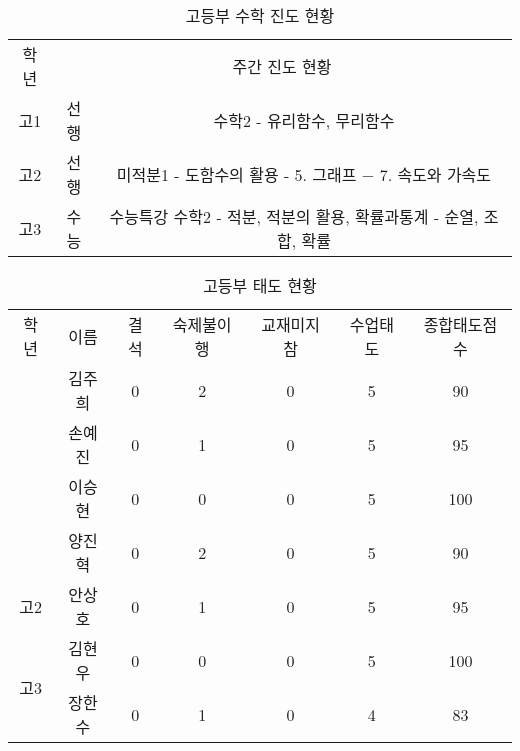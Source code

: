 \documentclass[idxtotoc,hyperref,openany]{labbook} %
\begin{document}


\begin{table}[h]
\centering
\begin{adjustbox}{width=\textwidth}
\begin{tabular}{c||c|c}
\toprule
\midrule
학년 & \multicolumn{2}{c}{주간 진도 현황} \\
\hhline{=||==}
고1 & 선행 & 수학2 - 유리함수, 무리함수\\
\hline
고2 & 선행 & 미적분1 - 도함수의 활용 - 5. 그래프 $-$ 7. 속도와 가속도\\
\hline
\multirow{1}{*}{고3} & 수능 & 수능특강 수학2 - 적분, 적분의 활용, 확률과통계 - 순열, 조합, 확률 \\ 

\hline
\end{tabular}
\end{adjustbox}
\caption{\label{tab:ii} 고등부 수학 진도 현황 }
\end{table}





\begin{table}[H]
\centering
\begin{adjustbox}{width=\textwidth}
\begin{tabular}{c|c||c|c|c|c|c}
\toprule
\midrule
학년 & 이름 & 결석 & 숙제불이행 & 교재미지참 & 수업태도 & 종합태도점수 \\
\hhline{=|=||=|=|=|=|=}
\multirow{4}{*}{고1}			& 김주희 & 0 & 2 & 0 & 5 & 90   \\ \hhline{~------}
					& 손예진 & 0 & 1 & 0 & 5 & 95  \\ \hhline{~------}
					& 이승현 & 0 & 0 & 0 & 5 & 100  \\ \hhline{~------}
					& 양진혁 & 0 & 2 & 0 & 5 & 90 \\
\hline
\multirow{1}{*}{고2}			& 안상호 & 0 & 1 & 0 & 5 & 95	\\ 
\hline
\multirow{2}{*}{고3}			& 김현우 & 0 & 0 & 0 & 5 & 100  \\ \hhline{~------}
					& 장한수 & 0 & 1 & 0 & 4 & 83	\\
\hline
\end{tabular}
\end{adjustbox}
\caption{\label{tab:iii} 고등부 태도 현황 }
\end{table}
\end{document}
